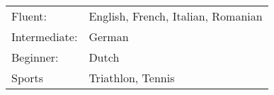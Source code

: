 


\label{sec:further_relevant_information}

\begin{tabular}{p{3cm}l}
	Fluent:	& English, French, Italian, Romanian \\

	Intermediate: & German \\

	Beginner: & Dutch \\

	Sports			& Triathlon, Tennis \\
	
\end{tabular}








